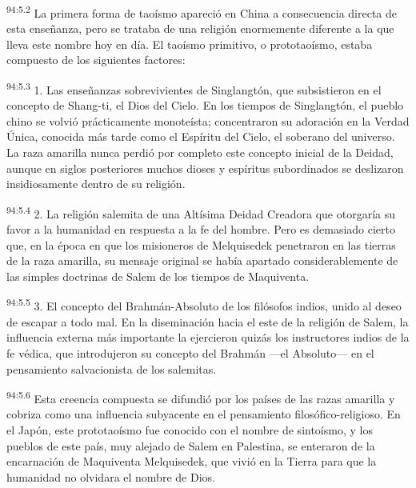 \par
\textsuperscript{94:5.2} La primera forma de taoísmo apareció en China a consecuencia directa de esta enseñanza, pero se trataba de una religión enormemente diferente a la que lleva este nombre hoy en día. El taoísmo primitivo, o prototaoísmo, estaba compuesto de los siguientes factores:

\par
\textsuperscript{94:5.3} 1. Las enseñanzas sobrevivientes de Singlangtón, que subsistieron en el concepto de Shang-ti, el Dios del Cielo. En los tiempos de Singlangtón, el pueblo chino se volvió prácticamente monoteísta; concentraron su adoración en la Verdad Única, conocida más tarde como el Espíritu del Cielo, el soberano del universo. La raza amarilla nunca perdió por completo este concepto inicial de la Deidad, aunque en siglos posteriores muchos dioses y espíritus subordinados se deslizaron insidiosamente dentro de su religión.

\par
\textsuperscript{94:5.4} 2. La religión salemita de una Altísima Deidad Creadora que otorgaría su favor a la humanidad en respuesta a la fe del hombre. Pero es demasiado cierto que, en la época en que los misioneros de Melquisedek penetraron en las tierras de la raza amarilla, su mensaje original se había apartado considerablemente de las simples doctrinas de Salem de los tiempos de Maquiventa.

\par
\textsuperscript{94:5.5} 3. El concepto del Brahmán-Absoluto de los filósofos indios, unido al deseo de escapar a todo mal. En la diseminación hacia el este de la religión de Salem, la influencia externa más importante la ejercieron quizás los instructores indios de la fe védica, que introdujeron su concepto del Brahmán ---el Absoluto--- en el pensamiento salvacionista de los salemitas.

\par
\textsuperscript{94:5.6} Esta creencia compuesta se difundió por los países de las razas amarilla y cobriza como una influencia subyacente en el pensamiento filosófico-religioso. En el Japón, este prototaoísmo fue conocido con el nombre de sintoísmo, y los pueblos de este país, muy alejado de Salem en Palestina, se enteraron de la encarnación de Maquiventa Melquisedek, que vivió en la Tierra para que la humanidad no olvidara el nombre de Dios.

